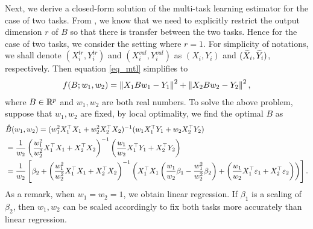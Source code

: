 Next, we derive a closed-form solution of the multi-task learning estimator for the case of two tasks.
From \cite{WZR20}, we know that we need to explicitly restrict the output dimension $r$ of $B$ so that there is transfer between the two tasks.
Hence for the case of two tasks, we consider the setting where $r=1$.
For simplicity of notations, we shall denote $(X_i^{tr},Y_i^{tr})$ and $(X_i^{val},Y_i^{val})$ as $(X_i,Y_i)$ and  $(\widetilde X_i,\widetilde Y_i)$, respectively. Then equation \eqref{eq_mtl} simplifies to
\begin{align}\label{eq_mtl_2task}
	f(B; w_1, w_2) = \left\| X_1 B w_1 - Y_1 \right\|^2 + \left\| X_2 B w_2 - Y_2 \right\|^2,
\end{align}
where $B\in\mathbb{R}^p$ and $w_1, w_2$ are both real numbers. To solve the above problem, suppose that $w_1, w_2$ are fixed, by local optimality, we find the optimal $B$ as
\begin{align}
	& \hat{B}(w_1, w_2) = (w_1^2 X_1^{\top}X_1 + w_2^2 X_2^{\top}X_2)^{-1} (w_1 X_1^{\top}Y_1 + w_2 X_2^{\top}Y_2) \label{hatB}\\
	&= \frac{1}{w_2} \left( \frac{w_1^2}{w_2^2}  X_1^{\top}X_1 + X_2^{\top}X_2\right)^{-1} \left(\frac{w_1}{w_2} X_1^{\top}Y_1 + X_2^{\top}Y_2\right) \nonumber\\
	&= \frac{1}{w_2}\left[\beta_2 + \left(\frac{w_1^2}{w_2^2} X_1^{\top}X_1 + X_2^{\top}X_2\right)^{-1}\left({X_1^{\top}X_1\left(\frac{w_1}{w_2}\beta_1 - \frac{w_1^2}{w_2^2} \beta_2\right) + \left(\frac{w_1}{w_2} X_1^{\top}\varepsilon_1 + X_2^{\top}\varepsilon_2\right)}\right)\right]. \nonumber
\end{align}
As a remark, when $w_1 = w_2 = 1$, we obtain linear regression.
If $\beta_1$ is a scaling of $\beta_2$, then  $w_1, w_2$ can be scaled accordingly to fix both tasks more accurately than linear regression.


